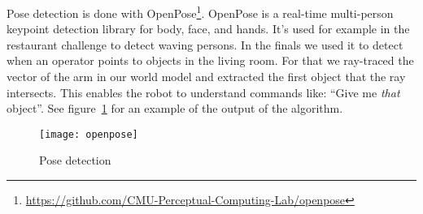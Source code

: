 Pose detection is done with OpenPose\footnote{\url{https://github.com/CMU-Perceptual-Computing-Lab/openpose}}.
OpenPose is a real-time multi-person keypoint detection library for body, face, and hands.
It's used for example in the restaurant challenge to detect waving persons.
In the finals we used it to detect when an operator points to objects in the living room.
For that we ray-traced the vector of the arm in our world model and extracted the first object that the ray intersects.
This enables the robot to understand commands like: ``Give me \emph{that} object''.
See figure~\ref{fig:pose_detection} for an example of the output of the algorithm.

\begin{figure}[H]
	\centering
	\texttt{[image: openpose]}
	\caption{Pose detection}
	\label{fig:pose_detection}
\end{figure} 